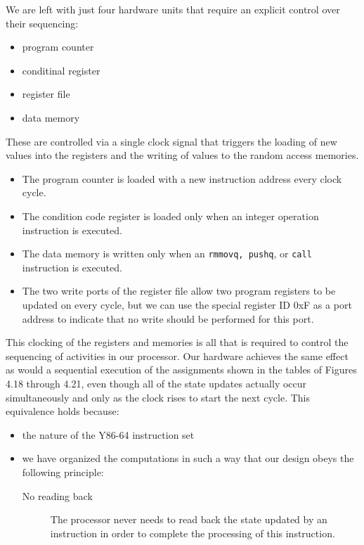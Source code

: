 \documentclass[11pt]{article}
\begin{document}
We are left with just four hardware units that require an explicit control over their sequencing:\\
\begin{itemize}
\item program counter\\
\item conditinal register\\
\item register file\\
\item data memory\\
\end{itemize}
These are controlled via a single clock signal that triggers the loading of new values into the registers and the writing of values to the random access memories.\\

\begin{itemize}
\item The program counter is loaded with a new instruction address every clock cycle.\\
\item The condition code register is loaded only when an integer operation instruction is executed.\\
\item The data memory is written only when an \texttt{rmmovq, pushq}, or \texttt{call} instruction is executed.\\
\item The two write ports of the register file allow two program registers to be updated on every cycle, but we can use the special register ID 0xF as a port address to indicate that no write should be performed for this port.\\
\end{itemize}


This clocking of the registers and memories is all that is required to control the sequencing of activities in our processor. Our hardware achieves the same effect as would a sequential execution of the assignments shown in the tables of Figures 4.18 through 4.21, even though all of the state updates actually occur simultaneously and only as the clock rises to start the next cycle. This equivalence holds because:\\
\begin{itemize}
\item the nature of the Y86-64 instruction set\\
\item we have organized the computations in such a way that our design obeys the following principle:\\
\begin{description}
\item[{No reading back}] The processor never needs to read back the state updated by an instruction in order to complete the processing of this instruction.\\
\end{description}
\end{itemize}
\end{document}
